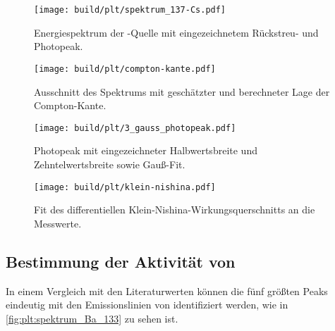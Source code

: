 

\begin{figure}
    \centering
    \texttt{[image: build/plt/spektrum\_137-Cs.pdf]}
    \caption{Energiespektrum der -Quelle mit eingezeichnetem Rückstreu- und Photopeak.}
    \label{fig:plt:spektrum_Cs_137}
\end{figure}

\begin{figure}
    \centering
    \texttt{[image: build/plt/compton-kante.pdf]}
    \caption{Ausschnitt des Spektrums mit geschätzter und berechneter Lage der Compton-Kante.}
    \label{fig:plt:compton_kante}
\end{figure}

\begin{figure}
    \centering
    \texttt{[image: build/plt/3\_gauss\_photopeak.pdf]}
    \caption{Photopeak mit eingezeichneter Halbwertsbreite und Zehntelwertsbreite sowie Gauß-Fit.}
    \label{fig:plt:photopeak_fwhm_fwtm} %
\end{figure}

\begin{figure}
    \centering
    \texttt{[image: build/plt/klein-nishina.pdf]}
    \caption{Fit des differentiellen Klein-Nishina-Wirkungsquerschnitts an die Messwerte.}
    \label{fig:plt:klein_nishina}
\end{figure}


\FloatBarrier
\subsection{Bestimmung der Aktivität von } \label{sec:auswertung:Ba_133}

In einem Vergleich mit den Literaturwerten \cite{lara}
können die fünf größten Peaks eindeutig mit den Emissionslinien von  identifiziert werden,
wie in \autoref{fig:plt:spektrum_Ba_133} zu sehen ist.

